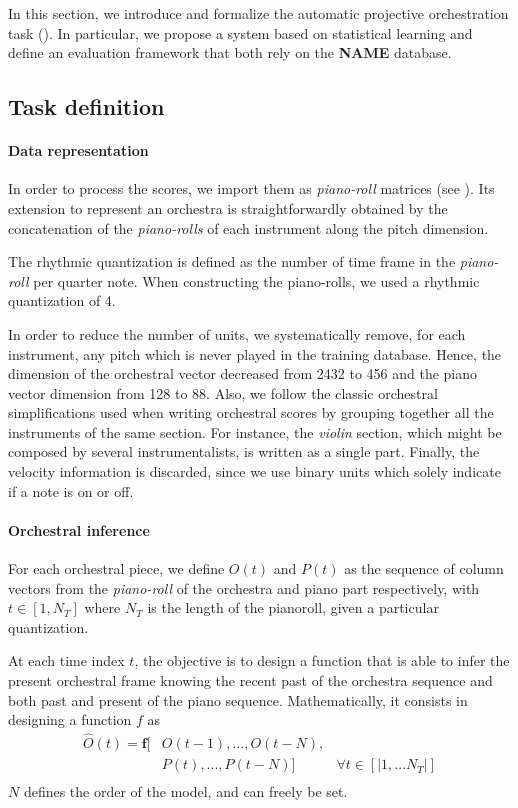 \documentclass[twoside,twocolumn]{article}
\begin{document}
In this section, we introduce and formalize the automatic projective orchestration task (). In particular, we propose a system based on statistical learning and define an evaluation framework that both rely on the \textbf{NAME} database.

\subsection{Task definition}
\paragraph{Data representation}
In order to process the scores, we import them as \textit{piano-roll} matrices (see ). 
Its extension to represent an orchestra is straightforwardly obtained by the concatenation of the \textit{piano-rolls} of each instrument along the pitch dimension.

The rhythmic quantization is defined as the number of time frame in the \textit{piano-roll} per quarter note. When constructing the piano-rolls, we used a rhythmic quantization of 4.

In order to reduce the number of units, we systematically remove, for each instrument, any pitch which is never played in the training database. Hence, the dimension of the orchestral vector decreased from 2432 to 456 and the piano vector dimension from 128 to 88.
Also, we follow the classic orchestral simplifications used when writing orchestral scores by grouping together all the instruments of the same section. For instance, the \textit{violin} section, which might be composed by several instrumentalists, is written as a single part.
Finally, the velocity information is discarded, since we use binary units which solely indicate if a note is on or off.

\paragraph{Orchestral inference}
For each orchestral piece, we define $O(t)$ and $P(t)$ as the sequence of column vectors from the \textit{piano-roll} of the orchestra and piano part respectively, with $t \in \left[ 1,N_{T} \right]$ where $N_{T}$ is the length of the pianoroll, given a particular quantization.

At each time index $t$, the objective is to design a function that is able to infer the present orchestral frame knowing the recent past of the orchestra sequence and both past and present of the piano sequence. Mathematically, it consists in designing a function $f$ as
\begin{equation}
\begin{aligned}
\hat{O}(t) = \bm{f}\lbrack & O(t-1), ..., O(t-N), & \\
	& P(t), ... ,P(t-N) \rbrack & \forall t \in \left\lbrack|1, ... N_{T}|\right\rbrack\\
\end{aligned}
\label{eq:inference_function}
\end{equation}
$N$ defines the order of the model, and can freely be set.
\end{document}
